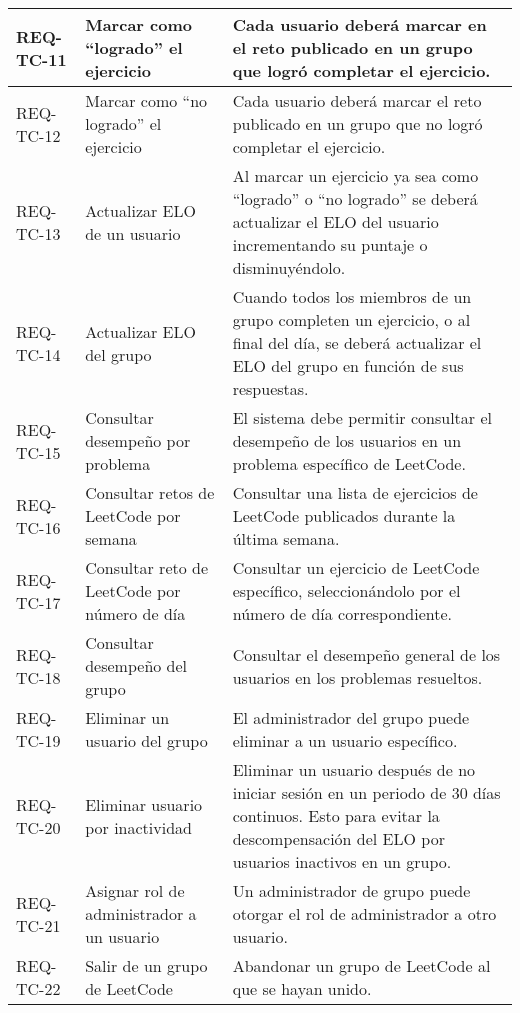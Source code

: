 \begin{longtable}{|>{\raggedright\arraybackslash}p{3cm}|>{\raggedright\arraybackslash}p{4cm}|>{\raggedright\arraybackslash}p{7cm}|}
    \hline
    REQ-TC-11 & Marcar como “logrado” el ejercicio & Cada usuario deberá marcar en el reto publicado en un grupo que logró completar el ejercicio. \\
    \hline
    REQ-TC-12 & Marcar como “no logrado” el ejercicio & Cada usuario deberá marcar el reto publicado en un grupo que no logró completar el ejercicio. \\
    \hline
    REQ-TC-13 & Actualizar ELO de un usuario & Al marcar un ejercicio ya sea como “logrado” o “no logrado” se deberá actualizar el ELO del usuario incrementando su puntaje o disminuyéndolo. \\
    \hline
    REQ-TC-14 & Actualizar ELO del grupo & Cuando todos los miembros de un grupo completen un ejercicio, o al final del día, se deberá actualizar el ELO del grupo en función de sus respuestas. \\
    \hline
    REQ-TC-15 & Consultar desempeño por problema & El sistema debe permitir consultar el desempeño de los usuarios en un problema específico de LeetCode. \\
    \hline
    REQ-TC-16 & Consultar retos de LeetCode por semana & Consultar una lista de ejercicios de LeetCode publicados durante la última semana. \\
    \hline
    REQ-TC-17 & Consultar reto de LeetCode por número de día & Consultar un ejercicio de LeetCode específico, seleccionándolo por el número de día correspondiente. \\
    \hline
    REQ-TC-18 & Consultar desempeño del grupo & Consultar el desempeño general de los usuarios en los problemas resueltos. \\
    \hline
    REQ-TC-19 & Eliminar un usuario del grupo & El administrador del grupo puede eliminar a un usuario específico. \\
    \hline
    REQ-TC-20 & Eliminar usuario por inactividad & Eliminar un usuario después de no iniciar sesión en un periodo de 30 días continuos. Esto para evitar la descompensación del ELO por usuarios inactivos en un grupo. \\
    \hline
    REQ-TC-21 & Asignar rol de administrador a un usuario & Un administrador de grupo puede otorgar el rol de administrador a otro usuario. \\
    \hline
    REQ-TC-22 & Salir de un grupo de LeetCode & Abandonar un grupo de LeetCode al que se hayan unido. \\
\end{longtable}

